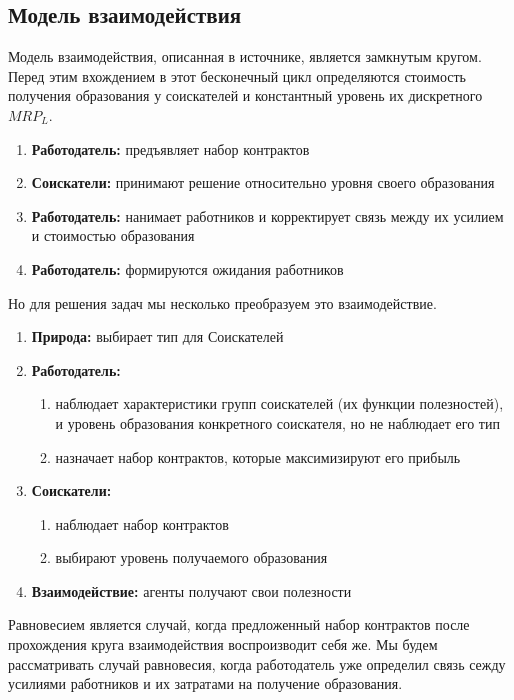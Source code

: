 \subsection{Модель взаимодействия}
\indent\setlength{\parindent}{1em}Модель взаимодействия, описанная в источнике, является замкнутым кругом. Перед этим вхождением в этот бесконечный цикл определяются стоимость получения образования у соискателей и константный уровень их дискретного $MRP_L$.
\begin{enumerate}
    \item \textbf{Работодатель:} предъявляет набор контрактов
    \item \textbf{Соискатели:} принимают решение относительно уровня своего образования
    \item \textbf{Работодатель:} нанимает работников и корректирует связь между их усилием и стоимостью образования
    \item \textbf{Работодатель:} формируются ожидания работников
\end{enumerate}
\indent\setlength{\parindent}{1em}Но для решения задач мы несколько преобразуем это взаимодействие.
\begin{enumerate}
    \item \textbf{Природа:} выбирает тип для Соискателей
    \item \textbf{Работодатель:} \begin{enumerate}
        \item наблюдает характеристики групп соискателей (их функции полезностей), и уровень образования конкретного соискателя, но не наблюдает его тип
        \item назначает набор контрактов, которые максимизируют его прибыль
    \end{enumerate}
    \item \textbf{Соискатели:} \begin{enumerate}
        \item наблюдает набор контрактов
        \item выбирают уровень получаемого образования
    \end{enumerate}
    \item \textbf{Взаимодействие:} агенты получают свои полезности
\end{enumerate}
\indent\setlength{\parindent}{1em}Равновесием является случай, когда предложенный набор контрактов после прохождения
круга взаимодействия воспроизводит себя же. Мы будем рассматривать случай равновесия, когда работодатель уже
определил связь сежду усилиями работников и их затратами на получение образования.
